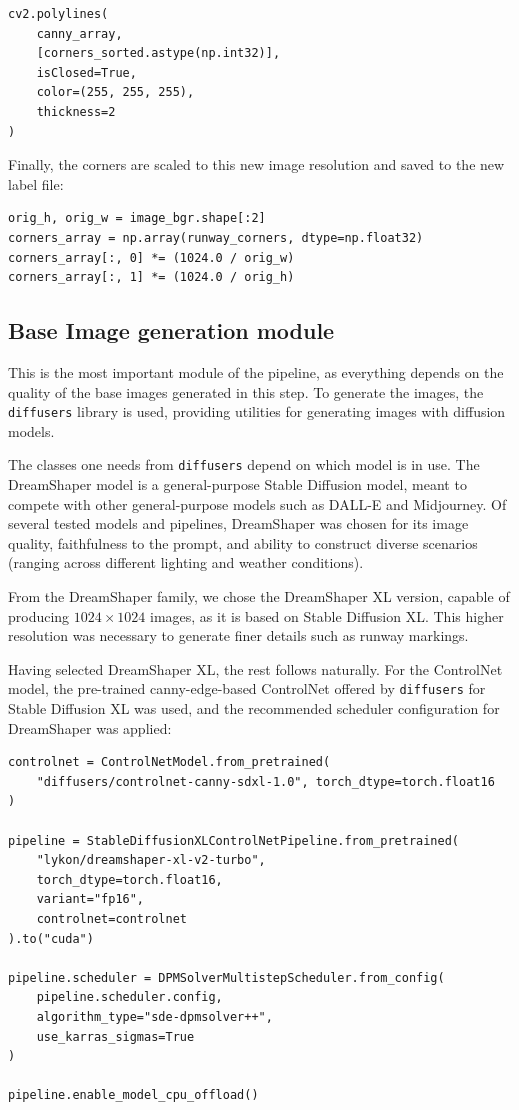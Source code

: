 \begin{lstlisting}
cv2.polylines(
    canny_array,
    [corners_sorted.astype(np.int32)],
    isClosed=True,
    color=(255, 255, 255),
    thickness=2
)
\end{lstlisting}

Finally, the corners are scaled to this new image resolution and saved to the new label file:

\begin{lstlisting}
orig_h, orig_w = image_bgr.shape[:2]
corners_array = np.array(runway_corners, dtype=np.float32)
corners_array[:, 0] *= (1024.0 / orig_w)
corners_array[:, 1] *= (1024.0 / orig_h)
\end{lstlisting}

\subsection{Base Image generation module}

This is the most important module of the pipeline, as everything depends on the quality of the base images generated in this step. 
To generate the images, the \texttt{diffusers} library \cite{???} is used, providing utilities for generating images with diffusion models.

The classes one needs from \texttt{diffusers} depend on which model is in use. 
The DreamShaper model \cite{???} is a general-purpose Stable Diffusion model, meant to compete with other general-purpose models such as DALL-E and Midjourney. 
Of several tested models and pipelines, DreamShaper was chosen for its image quality, faithfulness to the prompt, and ability to construct diverse scenarios (ranging across different lighting and weather conditions).

From the DreamShaper family, we chose the DreamShaper XL version, capable of producing $1024 \times 1024$ images, as it is based on Stable Diffusion XL. 
This higher resolution was necessary to generate finer details such as runway markings.

Having selected DreamShaper XL, the rest follows naturally. 
For the ControlNet model, the pre-trained canny-edge-based ControlNet offered by \texttt{diffusers} for Stable Diffusion XL was used, and the recommended scheduler configuration for DreamShaper was applied:

\begin{lstlisting}
controlnet = ControlNetModel.from_pretrained(
    "diffusers/controlnet-canny-sdxl-1.0", torch_dtype=torch.float16
)

pipeline = StableDiffusionXLControlNetPipeline.from_pretrained(
    "lykon/dreamshaper-xl-v2-turbo",
    torch_dtype=torch.float16,
    variant="fp16",
    controlnet=controlnet
).to("cuda")

pipeline.scheduler = DPMSolverMultistepScheduler.from_config(
    pipeline.scheduler.config,
    algorithm_type="sde-dpmsolver++",
    use_karras_sigmas=True
)

pipeline.enable_model_cpu_offload()
\end{lstlisting}

